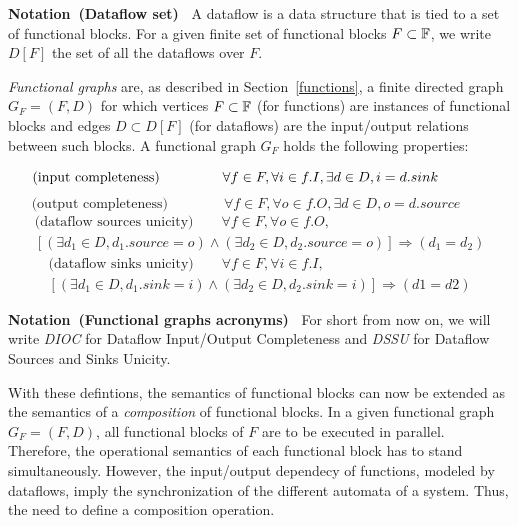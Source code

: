 \documentclass[runningheads]{llncs}
\newcommand{\Notation}[1]{\noindent\textbf{Notation~(#1)~}}
\newcommand{\s}{\hspace{1em}}
\newcommand{\halfs}{\hspace{0.5em}}
\begin{document}
\Notation{Dataflow set} A dataflow is a data structure that is tied to a set of functional blocks. For a given finite set of functional blocks $F \subset \mathbb{F}$, we write $D[F]$ the set of all the dataflows over $F$.

\begin{definition} 
    \emph{Functional graphs} are, as described in Section~\ref{functions}, a finite directed graph $G_F = (F,D)$ for which vertices $F\subset\mathbb{F}$ (for functions) are instances of functional blocks and edges $D \subset D[F]$ (for dataflows) are the input/output relations between such blocks.
    A functional graph $G_F$ holds the following properties:

    \begin{equation}\label{input_completeness}
        \text{(input completeness)}\s\s\s\s\halfs\forall f\in F,\forall i \in f.I, \exists d \in D, i = d.sink\s\s\s\halfs
    \end{equation}
    \begin{equation}\label{output_completeness}
        \text{(output completeness)}\s\s\s\s\forall f\in F,\forall o \in f.O, \exists d \in D, o = d.source\s\s
    \end{equation}
    \begin{multline}\label{sources_unicity}
        \text{(dataflow sources unicity)}\s\s\forall f\in F, \forall o \in f.O,\\
        [(\exists d_1 \in D, d_1.source = o)\wedge(\exists d_2 \in D, d_2.source = o)] \Rightarrow (d_1 = d_2)
    \end{multline}
    \begin{multline}\label{sinks_unicity}
        \text{(dataflow sinks unicity)}\s\s\forall f\in F, \forall i \in f.I, \\
        [(\exists d_1 \in D, d_1.sink = i)\wedge(\exists d_2 \in D, d_2.sink = i)] \Rightarrow (d1 = d2)
    \end{multline}
\end{definition}

\Notation{Functional graphs acronyms} For short from now on, we will write \emph{DIOC} for Dataflow Input/Output Completeness and \emph{DSSU} for Dataflow Sources and Sinks Unicity. 

With these defintions, the semantics of functional blocks can now be extended as the semantics of a \emph{composition} of functional blocks. In a given functional graph $G_F = (F,D)$, all functional blocks of $F$ are to be executed in parallel. Therefore, the operational semantics of each functional block has to stand simultaneously. However, the input/output dependecy of functions, modeled by dataflows, imply the synchronization of the different automata of a system. Thus, the need to define a composition operation.
\end{document}
